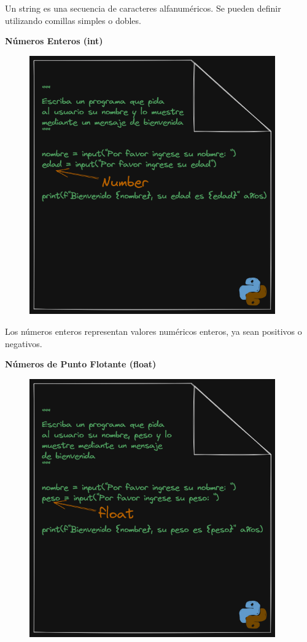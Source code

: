 \documentclass[
  a4paper,
  DIV=11,
  numbers=noendperiod,
  onepage,
  openany]{scrreprt}
\begin{document}
Un string es una secuencia de caracteres alfanuméricos. Se pueden
definir utilizando comillas simples o dobles.

\textbf{Números Enteros (int)}

\begin{figure}

{\centering \includegraphics[width=4.16667in,height=\textheight]{unidades/unidad3/images/number.png}

}

\end{figure}

Los números enteros representan valores numéricos enteros, ya sean
positivos o negativos.

\textbf{Números de Punto Flotante (float)}

\begin{figure}

{\centering \includegraphics[width=4.16667in,height=\textheight]{unidades/unidad3/images/float.png}

}

\end{figure}
\end{document}
